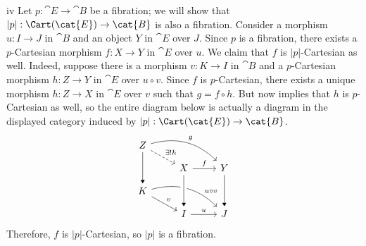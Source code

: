 \begin{partsolution}{iv}
Let \(p : \cat{E} \to \cat{B}\) be a fibration; we will show that \(|p| : \Cart(\cat{E}) \to \cat{B}\) is also a fibration.
Consider a morphism \(u : I \to J\) in \(\cat{B}\) and an object \(Y\) in \(\cat{E}\) over \(J\).
Since \(p\) is a fibration, there exists a \(p\)-Cartesian morphism \(f : X \to Y\) in \(\cat{E}\) over \(u\).
We claim that \(f\) is \(|p|\)-Cartesian as well.
Indeed, suppose there is a morphism \(v : K \to I\) in \(\cat{B}\) and a \(p\)-Cartesian morphism \(h : Z \to Y\) in \(\cat{E}\) over \(u \circ v\).
Since \(f\) is \(p\)-Cartesian, there exists a unique morphism \(h : Z \to X\) in \(\cat{E}\) over \(v\) such that \(g = f \circ h\).
But now  implies that \(h\) is \(p\)-Cartesian as well, so the entire diagram below is actually a diagram in the displayed category induced by \(|p| : \Cart(\cat{E}) \to \cat{B}\).
\begin{equation*}
\begin{tikzcd}[row sep=small]
Z \arrow[rd, dashed, "\exists! h"] \arrow[rrd, bend left, "g"] \arrow[dd, -Triangle] \\
& X \arrow[r, "f"] & Y \arrow[dd, -Triangle] \\
K \arrow[rd, "v"] \arrow[rrd, bend left, near end, "u \circ v"] \\
& I \arrow[r, "u"] & J
\arrow[from=uul, to=l, -Triangle, crossing over]
\end{tikzcd}
\end{equation*}
Therefore, \(f\) is \(|p|\)-Cartesian, so \(|p|\) is a fibration.
\end{partsolution}